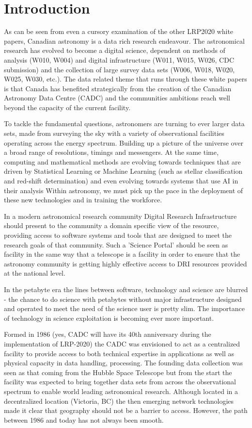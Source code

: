 \documentclass[11pt]{article}
\begin{document}
\section{Introduction}


As can be seen from even a cursory examination of the other LRP2020 white papers, Canadian astronomy is a data rich research endeavour.  The astronomical research has evolved to become a digital science, dependent on methods of analysis (W010, W004) and digital infrastructure (W011, W015, W026, CDC submission) and the collection of large survey data sets (W006, W018, W020, W025, W030, etc.).  The data related theme that runs through these white papers is that Canada has benefited strategically from the creation of the Canadian Astronomy Data Centre (CADC) and the communities ambitions reach well beyond the capacity of the current facility. 

To tackle the fundamental questions, astronomers are turning to ever larger data sets, made from surveying the sky with a variety of observational facilities operating across the energy spectrum. Building up a picture of the universe over a broad range of resolutions, timings and messengers.  At the same time, computing and mathematical methods are evolving towards techniques that are driven by Statistical Learning or Machine Learning (such as stellar classification and red-shift determination) and even evolving towards systems that use AI in their analysis  Within astronomy, we must pick up the pace in the deployment of these new technologies and in training the workforce.


In a modern astronomical research community Digital Research Infrastructure should present to the community a domain specific view of the resource, providing access to software systems and tools that are designed to meet the research goals of that community.  Such a 'Science Portal' should be seen as facility in the same way that a telescope is a facility in order to ensure that the astronomy community is getting highly effective access to DRI resources provided at the national level.

In the petabyte era the lines between software, technology and science are blurred - the chance to do science with petabytes without major infrastructure designed and operated to meet the need of the science user is pretty slim.  The importance of technology in science exploitation is becoming ever more important.

Formed in 1986 (yes, CADC will have its 40th anniversary during the implementation of LRP-2020) the CADC was envisioned to act as a centralized facility to provide access to both technical expertise in applications as well as physical capacity in data handling, processing. The founding data collection was seen as that coming from the Hubble Space Telescope but from the start the facility was expected to bring together data sets from across the observational spectrum to enable world leading astronomical research. Although located in a decentralized location (Victoria, BC) the then emerging network technologies made it clear that geography should not be a barrier to access.  However, the path between 1986 and today has not always been smooth.
\end{document}
